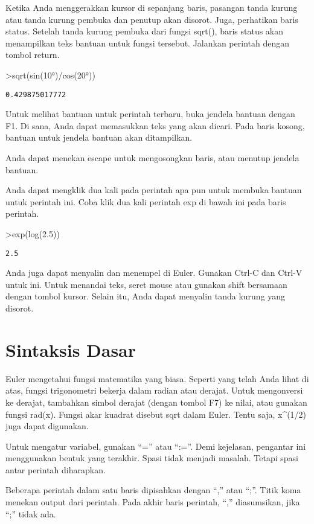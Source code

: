 \documentclass[
]{book}
\begin{document}
Ketika Anda menggerakkan kursor di sepanjang baris, pasangan tanda kurung atau tanda kurung pembuka dan penutup akan disorot. Juga, perhatikan baris status. Setelah tanda kurung pembuka dari fungsi sqrt(), baris status akan menampilkan teks bantuan untuk fungsi tersebut. Jalankan perintah dengan tombol return.

\textgreater sqrt(sin(10°)/cos(20°))

\begin{verbatim}
0.429875017772
\end{verbatim}

Untuk melihat bantuan untuk perintah terbaru, buka jendela bantuan dengan F1. Di sana, Anda dapat memasukkan teks yang akan dicari. Pada baris kosong, bantuan untuk jendela bantuan akan ditampilkan.

Anda dapat menekan escape untuk mengosongkan baris, atau menutup jendela bantuan.

Anda dapat mengklik dua kali pada perintah apa pun untuk membuka bantuan untuk perintah ini. Coba klik dua kali perintah exp di bawah ini pada baris perintah.

\textgreater exp(log(2.5))

\begin{verbatim}
2.5
\end{verbatim}

Anda juga dapat menyalin dan menempel di Euler. Gunakan Ctrl-C dan Ctrl-V untuk ini. Untuk menandai teks, seret mouse atau gunakan shift bersamaan dengan tombol kursor. Selain itu, Anda dapat menyalin tanda kurung yang disorot.

\section{Sintaksis Dasar}\label{sintaksis-dasar}

Euler mengetahui fungsi matematika yang biasa. Seperti yang telah Anda lihat di atas, fungsi trigonometri bekerja dalam radian atau derajat. Untuk mengonversi ke derajat, tambahkan simbol derajat (dengan tombol F7) ke nilai, atau gunakan fungsi rad(x). Fungsi akar kuadrat disebut sqrt dalam Euler. Tentu saja, x\^{}(1/2) juga dapat digunakan.

Untuk mengatur variabel, gunakan ``='' atau ``:=''. Demi kejelasan, pengantar ini menggunakan bentuk yang terakhir. Spasi tidak menjadi masalah. Tetapi spasi antar perintah diharapkan.

Beberapa perintah dalam satu baris dipisahkan dengan ``,'' atau ``;''. Titik koma menekan output dari perintah. Pada akhir baris perintah, ``,'' diasumsikan, jika ``;'' tidak ada.
\end{document}
